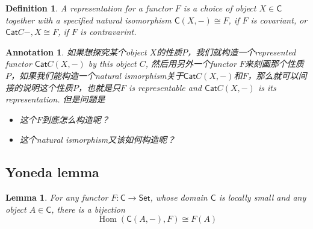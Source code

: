 \documentclass{article}
\newtheorem{lemma}[theorem]{Lemma}
\newtheorem{definition}[theorem]{Definition}
\newtheorem{annotation}[theorem]{Annotation}
\newcommand*{\cat}[1]{\textsf{#1}\xspace}
\newcommand{\Cat}{\textsf{Cat}\xspace}
\newcommand{\Set}{\textsf{Set}\xspace}
\DeclareMathOperator{\Hom}{Hom}
\begin{document}
\begin{definition}
\rm A representation for a functor $F$ is a choice of object $X \in \cat{C}$ together with a specified natural isomorphism $\cat{C}(X,-) \cong F$, if $F$ is covariant, or $\Cat{C}{-,X} \cong F$, if $F$ is contravarint. 
\end{definition}


\begin{annotation}
\rm 如果想探究某个object $X$的性质$P$，我们就构造一个represented functor $\Cat{C}(X,-)$ by this object $C$, 然后用另外一个functor $F$来刻画那个性质$P$，如果我们能构造一个natural ismorphism关于$\Cat{C}(X,-)$和$F$，那么就可以间接的说明这个性质$P$，也就是只$F$ is representable and $\Cat{C}(X,-)$ is its representation. 但是问题是
\begin{itemize}
	\item 这个$F$到底怎么构造呢？ 
	\item 这个natural ismorphism又该如何构造呢？
\end{itemize}
\end{annotation}

\newpage
\subsection{Yoneda lemma}

\begin{lemma}
\rm For any functor $F: \cat{C} \to \Set$, whose domain $\cat{C}$ is locally small and any object $A \in \cat{C}$, there is a bijection 
$$
\Hom(\cat{C}(A,-),F) \cong F(A)
$$
\end{lemma}
\end{document}

